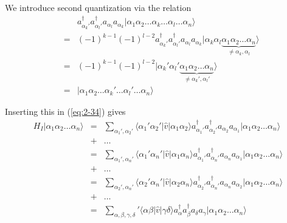 \documentclass[graybox,sectrefs,envcountresetchap,open=right]{svmonodo}
\begin{document}
We introduce second quantization via the relation
\begin{eqnarray}
	&& a_{\alpha_k'}^{\dagger} a_{\alpha_l'}^{\dagger} a_{\alpha_l} a_{\alpha_k} 
		|\alpha_1\alpha_2\dots\alpha_k\dots\alpha_l\dots\alpha_n\rangle \nonumber \\
	&=& (-1)^{k-1} (-1)^{l-2} a_{\alpha_k'}^{\dagger} a_{\alpha_l'}^{\dagger} a_{\alpha_l} a_{\alpha_k}
		|\alpha_k\alpha_l \underbrace{\alpha_1\alpha_2\dots\alpha_n}_{\neq \alpha_k,\alpha_l}\rangle \nonumber \\
	&=& (-1)^{k-1} (-1)^{l-2} 
	|\alpha_k'\alpha_l' \underbrace{\alpha_1\alpha_2\dots\alpha_n}_{\neq \alpha_k',\alpha_l'}\rangle \nonumber \\
	&=& |\alpha_1\alpha_2\dots\alpha_k'\dots\alpha_l'\dots\alpha_n\rangle \label{eq:2-35}
\end{eqnarray}






Inserting this in (\ref{eq:2-34}) gives
\begin{eqnarray}
	H_I |\alpha_1\alpha_2\dots\alpha_n\rangle
	&=& \sum_{\alpha_1', \alpha_2'} \langle \alpha_1'\alpha_2'|\hat{v}|\alpha_1\alpha_2\rangle
		a_{\alpha_1'}^{\dagger} a_{\alpha_2'}^{\dagger} a_{\alpha_2} a_{\alpha_1}
		|\alpha_1\alpha_2\dots\alpha_n\rangle \nonumber \\
	&+& \dots \nonumber \\
	&=& \sum_{\alpha_1', \alpha_n'} \langle \alpha_1'\alpha_n'|\hat{v}|\alpha_1\alpha_n\rangle
		a_{\alpha_1'}^{\dagger} a_{\alpha_n'}^{\dagger} a_{\alpha_n} a_{\alpha_1}
		|\alpha_1\alpha_2\dots\alpha_n\rangle \nonumber \\
	&+& \dots \nonumber \\
	&=& \sum_{\alpha_2', \alpha_n'} \langle \alpha_2'\alpha_n'|\hat{v}|\alpha_2\alpha_n\rangle
		a_{\alpha_2'}^{\dagger} a_{\alpha_n'}^{\dagger} a_{\alpha_n} a_{\alpha_2}
		|\alpha_1\alpha_2\dots\alpha_n\rangle \nonumber \\
	&+& \dots \nonumber \\
	&=& \sum_{\alpha, \beta, \gamma, \delta} ' \langle \alpha\beta|\hat{v}|\gamma\delta\rangle
		a^{\dagger}_\alpha a^{\dagger}_\beta a_\delta a_\gamma
		|\alpha_1\alpha_2\dots\alpha_n\rangle \label{eq:2-36}
\end{eqnarray}
\end{document}
